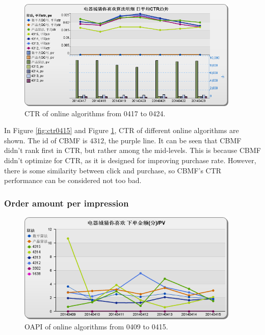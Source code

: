 \begin{figure}
\begin{center}

\includegraphics[width=400px]{fig/yixunexp/ctr0424.png}
\caption{\label{fig:ctr0424} CTR of online algorithms from 0417 to 0424.}
\end{center}
\end{figure}

In Figure \ref{fig:ctr0415} and Figure \ref{fig:ctr0424}, CTR of different online algorithms are shown. The id of CBMF is $4312$, the purple line. It can be seen that CBMF didn't rank first in CTR, but rather among the mid-levels. This is because CBMF didn't optimize for CTR, as it is designed for improving purchase rate. However, there is some similarity between click and purchase, so CBMF's CTR performance can be considered not too bad.

\subsubsection{Order amount per impression}

\begin{figure}
\begin{center}

\includegraphics[width=400px]{fig/yixunexp/OAPI0415.png}
\caption{\label{fig:oapi0415} OAPI of online algorithms  from 0409 to 0415.}
\end{center}
\end{figure}

